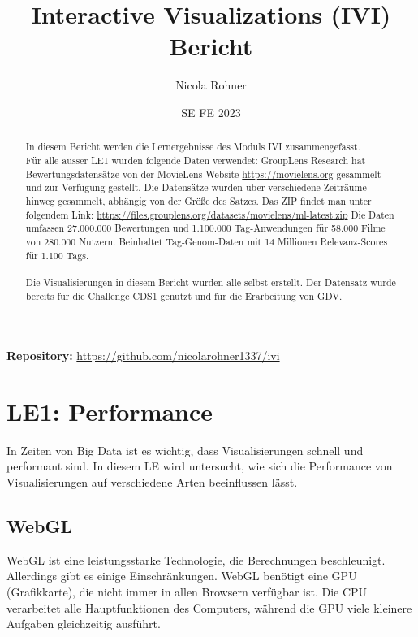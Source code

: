 \documentclass{article}
\title{Interactive Visualizations (IVI) Bericht}
\author{Nicola Rohner}
\date{SE FE 2023}
\begin{document}
\maketitle

\begin{center}
\textbf{Repository:} \url{https://github.com/nicolarohner1337/ivi}
\end{center}

\begin{abstract}
In diesem Bericht werden die Lernergebnisse des Moduls IVI zusammengefasst.\\
Für alle ausser LE1 wurden folgende Daten verwendet: \newline
GroupLens Research hat Bewertungsdatensätze von der MovieLens-Website \url{https://movielens.org} gesammelt und zur Verfügung gestellt.
Die Datensätze wurden über verschiedene Zeiträume hinweg gesammelt, abhängig von der Größe des Satzes. Das ZIP findet man unter folgendem Link: \url{https://files.grouplens.org/datasets/movielens/ml-latest.zip}
Die Daten umfassen 27.000.000 Bewertungen und 1.100.000 Tag-Anwendungen für 58.000 Filme von 280.000 Nutzern. Beinhaltet Tag-Genom-Daten mit 14 Millionen Relevanz-Scores für 1.100 Tags.\\
\noindent\\
Die Visualisierungen in diesem Bericht wurden alle selbst erstellt. 
Der Datensatz wurde bereits für die Challenge CDS1 genutzt und für die Erarbeitung von GDV.
\end{abstract}

\tableofcontents

\newpage

\section{LE1: Performance}
In Zeiten von Big Data ist es wichtig, dass Visualisierungen schnell und performant sind. In diesem LE wird untersucht, wie sich die Performance von Visualisierungen auf verschiedene Arten beeinflussen lässt.


\subsection{WebGL}
WebGL ist eine leistungsstarke Technologie, die Berechnungen beschleunigt. Allerdings gibt es einige Einschränkungen.
WebGL benötigt eine GPU (Grafikkarte), die nicht immer in allen Browsern verfügbar ist.
Die CPU verarbeitet alle Hauptfunktionen des Computers, während die GPU viele kleinere Aufgaben gleichzeitig ausführt.\cite{noauthor_cpu_nodate}
\end{document}
